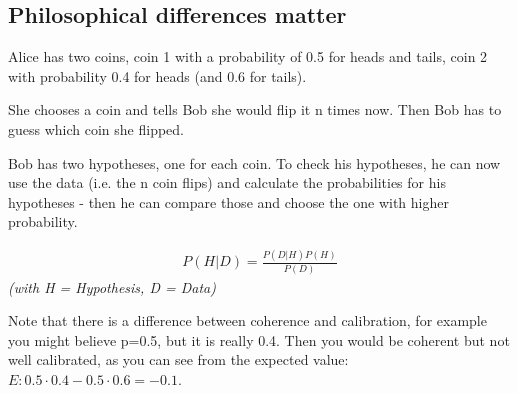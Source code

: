 \subsection*{Philosophical differences matter}
Alice has two coins, coin 1 with a probability of 0.5 for heads and tails, coin 2 with probability 0.4 for heads (and 0.6 for tails). 

She chooses a coin and tells Bob she would flip it n times now. Then Bob has to guess which coin she flipped.

Bob has two hypotheses, one for each coin. To check his hypotheses, he can now use the data (i.e. the n coin flips) and calculate the probabilities for his hypotheses - then he can compare those and choose the one with higher probability.

\begin{align*}
P(H|D) = \frac{P(D|H)P(H)}{P(D)}
\end{align*}
\textit{(with H = Hypothesis, D = Data)}

Note that there is a difference between coherence and calibration, for example you might believe p=0.5, but it is really 0.4. Then you would be coherent but not well calibrated, as you can see from the expected value: $E: 0.5 \cdot 0.4 - 0.5 \cdot 0.6 = -0.1$.

